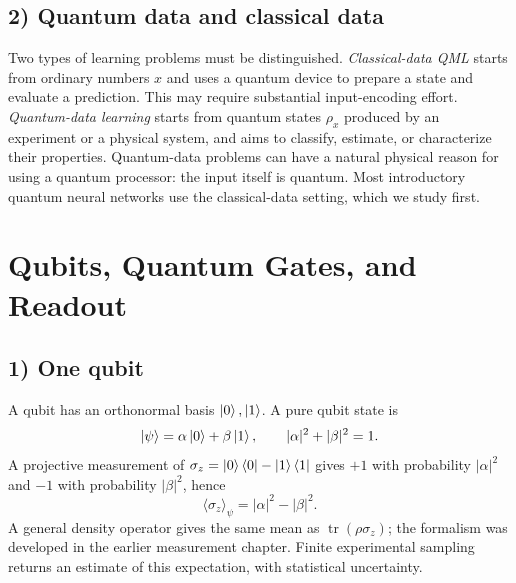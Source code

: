 \subsection*{2) Quantum data and classical data}
Two types of learning problems must be distinguished. \emph{Classical-data QML} starts from ordinary numbers $x$ and uses a quantum device to prepare a state and evaluate a prediction. This may require substantial input-encoding effort. \emph{Quantum-data learning} starts from quantum states $\rho_x$ produced by an experiment or a physical system, and aims to classify, estimate, or characterize their properties. Quantum-data problems can have a natural physical reason for using a quantum processor: the input itself is quantum. Most introductory quantum neural networks use the classical-data setting, which we study first.

\section{Qubits, Quantum Gates, and Readout}
\subsection*{1) One qubit}
A qubit has an orthonormal basis $\left|0\right\rangle,\left|1\right\rangle$. A pure qubit state is
\begin{equation}
 \left|\psi\right\rangle=\alpha\left|0\right\rangle+\beta\left|1\right\rangle,\qquad
 |\alpha|^2+|\beta|^2=1.
\end{equation}
A projective measurement of $\sigma_z=\left|0\right\rangle\left\langle0\right|-\left|1\right\rangle\left\langle1\right|$ gives $+1$ with probability $|\alpha|^2$ and $-1$ with probability $|\beta|^2$, hence
\begin{equation}
 \langle\sigma_z\rangle_\psi=|\alpha|^2-|\beta|^2.
\end{equation}
A general density operator gives the same mean as $\operatorname{tr}(\rho\sigma_z)$; the formalism was developed in the earlier measurement chapter. Finite experimental sampling returns an estimate of this expectation, with statistical uncertainty.

